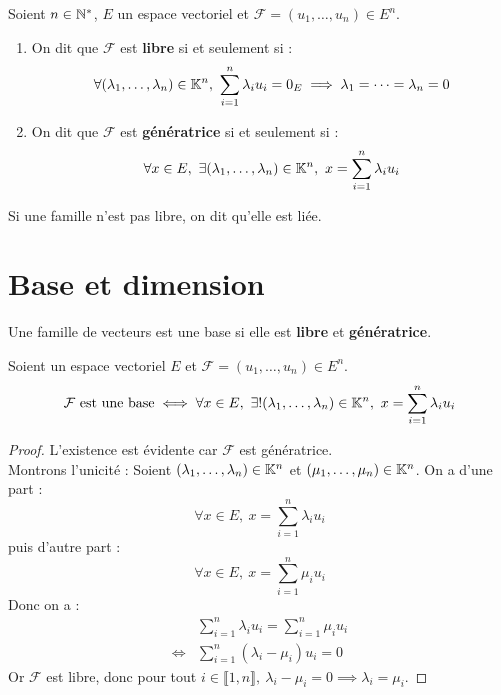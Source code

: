 \begin{definition}
	Soient $n \in \mathbb{N}^*$, $E$ un espace vectoriel et $\mathcal{F} = (u_1, \ldots, u_n) \in E^n$.
	\begin{enumerate}
		\item On dit que $\mathcal{F}$ est \textbf{libre} si et seulement si :
		\begin{align*}
			\forall (\lambda_1, \ldots, \lambda_n) \in \mathbb{K}^n,\ \sum_{i = 1}^n \lambda_i u_i = 0_E \implies \lambda_1 = \cdots = \lambda_n = 0
		\end{align*}
		\item On dit que $\mathcal{F}$ est \textbf{génératrice} si et seulement si :
		\begin{align*}
			\forall x \in E,\ \exists (\lambda_1, \ldots, \lambda_n) \in \mathbb{K}^n,\ x = \sum_{i = 1}^n \lambda_i u_i 
		\end{align*}
	\end{enumerate}
\end{definition}

\begin{remark}
	Si une famille n'est pas libre, on dit qu'elle est liée.
\end{remark}

\section{Base et dimension}
\begin{definition}[Base]
	Une famille de vecteurs est une base si elle est \textbf{libre} et \textbf{génératrice}.
\end{definition}

\begin{proposition}
	Soient un espace vectoriel $E$ et $\mathcal{F} = (u_1, \ldots, u_n) \in E^n$.
	\[ 
	\mathcal{F} \text{ est une base} \iff 
	\forall x \in E,\ \exists ! (\lambda_1, \ldots, \lambda_n) \in \mathbb{K}^n,\ x = \sum_{i = 1}^n \lambda_i u_i
	\]
\end{proposition}

\begin{proof}
	L'existence est évidente car $\mathcal{F}$ est génératrice. 
	\\
	Montrons l'unicité : Soient $(\lambda_1, \ldots, \lambda_n) \in \mathbb{K}^n$ et $(\mu_1, \ldots, \mu_n) \in \mathbb{K}^n$.
	On a d'une part :
	\[ \forall x \in E,\ x = \sum_{i=1}^{n} \lambda_i u_i \]
	puis d'autre part :
	\[ \forall x \in E,\ x = \sum_{i=1}^{n} \mu_i u_i \]
	Donc on a :
	\begin{align*}
		&\sum_{i=1}^{n} \lambda_i u_i = \sum_{i=1}^{n} \mu_i u_i \\
		\iff &\sum_{i=1}^{n} (\lambda_i - \mu_i) u_i = 0 
	\end{align*}
	Or $\mathcal{F}$ est libre, donc pour tout $i \in \llbracket 1, n \rrbracket,\ \lambda_i - \mu_i = 0 \implies \lambda_i = \mu_i$.
\end{proof}

